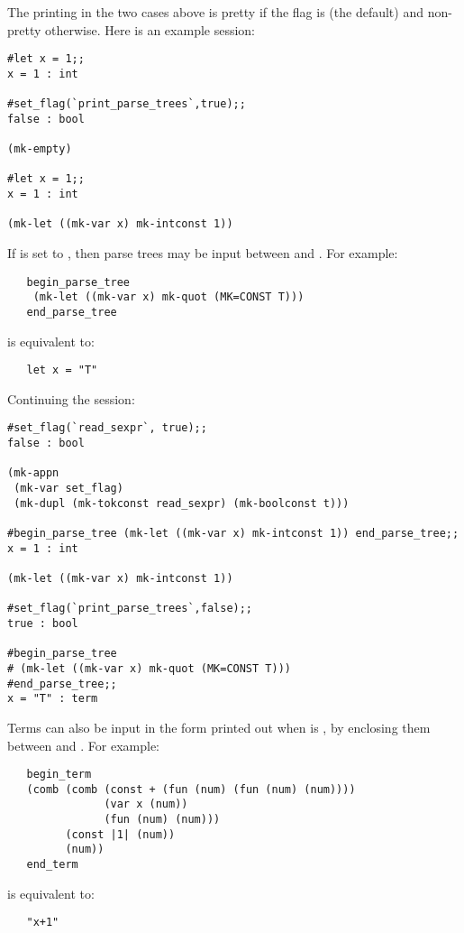 The printing in the two cases above is pretty if the flag 
is  (the default) and non-pretty otherwise.
Here is an example session:
\setcounter{sessioncount}{1}
\begin{session}\begin{verbatim}
#let x = 1;;
x = 1 : int

#set_flag(`print_parse_trees`,true);;
false : bool

(mk-empty)

#let x = 1;;
x = 1 : int

(mk-let ((mk-var x) mk-intconst 1))
\end{verbatim}\end{session}
If  
is set to , then parse trees may be input
 between  and . For example:
\begin{hol}\begin{verbatim}
   begin_parse_tree
    (mk-let ((mk-var x) mk-quot (MK=CONST T)))
   end_parse_tree
\end{verbatim}\end{hol}
is equivalent to:
\begin{hol}\begin{verbatim}
   let x = "T"
\end{verbatim}\end{hol}
Continuing the session:
\begin{session}\begin{verbatim}
#set_flag(`read_sexpr`, true);;
false : bool

(mk-appn
 (mk-var set_flag) 
 (mk-dupl (mk-tokconst read_sexpr) (mk-boolconst t)))

#begin_parse_tree (mk-let ((mk-var x) mk-intconst 1)) end_parse_tree;;
x = 1 : int

(mk-let ((mk-var x) mk-intconst 1))

#set_flag(`print_parse_trees`,false);;
true : bool

#begin_parse_tree
# (mk-let ((mk-var x) mk-quot (MK=CONST T)))
#end_parse_tree;;
x = "T" : term
\end{verbatim}\end{session}

\noindent Terms can also be input in the form printed out when  is
, by enclosing them between  and . 
For example:
\begin{hol}\begin{verbatim}
   begin_term
   (comb (comb (const + (fun (num) (fun (num) (num))))
               (var x (num))
               (fun (num) (num)))
         (const |1| (num))
         (num)) 
   end_term
\end{verbatim}\end{hol}
is equivalent to:
\begin{hol}\begin{verbatim}
   "x+1"
\end{verbatim}\end{hol}

